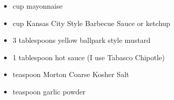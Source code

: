 \begin{itemize}
  \item {} cup mayonnaise
  \item {} cup Kansas City Style Barbecue Sauce or ketchup
  \item 3 tablespoons yellow ballpark style mustard
  \item 1 tablespoon hot sauce (I use Tabasco Chipotle)
  \item {} teaspoon  Morton Coarse Kosher Salt
  \item {} teaspoon garlic powder
\end{itemize}

